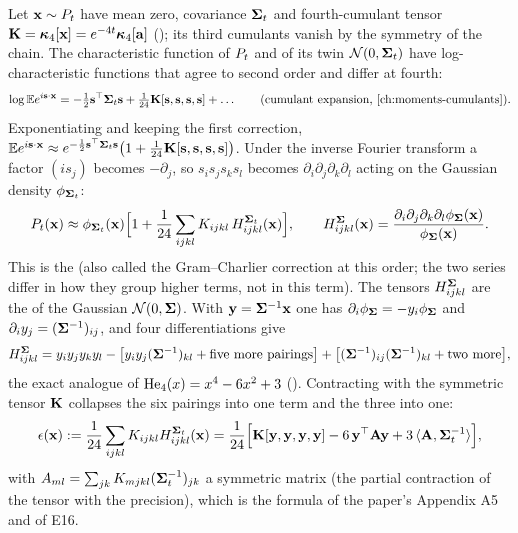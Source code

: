 Let $\mathbf{x}\sim P_t$ have mean zero, covariance $\mathbf{\Sigma}_t$ and fourth-cumulant tensor
$\mathbf{K}=\bm{\kappa}_4[\mathbf{x}]=e^{-4t}\bm{\kappa}_4[\mathbf{a}]$ (); its third
cumulants vanish by the symmetry of the chain. The characteristic function of $P_t$
and of its twin $\mathcal{N}\!\left(0,\mathbf{\Sigma}_t\right)$ have log-characteristic functions that agree to second
order and differ at fourth:
\begin{equation}
  \log\E e^{i\vect{s}\cdot\vx}=-\tfrac12\vect{s}^\top\Sig_t\vect{s}+\tfrac{1}{24}\mat{K}[\vect{s},\vect{s},\vect{s},\vect{s}]+\dots
  \qquad(\text{cumulant expansion, \Cref{ch:moments-cumulants}}).
\end{equation}
Exponentiating and keeping the first correction,
$\mathbb{E} e^{i\mathbf{s}\cdot\mathbf{x}}\approx e^{-\frac12\mathbf{s}^\top\mathbf{\Sigma}_t\mathbf{s}}\bigl(1+\tfrac1{24}\mathbf{K}[\mathbf{s},\mathbf{s},\mathbf{s},\mathbf{s}]\bigr)$.
Under the inverse Fourier transform a factor $(i s_j)$ becomes $-\partial_j$, so
$s_is_js_ks_l$ becomes $\partial_i\partial_j\partial_k\partial_l$ acting on the Gaussian density
$\phi_{\mathbf{\Sigma}_t}$:
\begin{equation}
  P_t(\mathbf{x})\approx\phi_{\mathbf{\Sigma}_t}(\mathbf{x})\Bigl[1+\frac1{24}\sum_{ijkl}K_{ijkl}\,H^{\mathbf{\Sigma}_t}_{ijkl}(\mathbf{x})\Bigr],
  \qquad
  H^{\mathbf{\Sigma}}_{ijkl}(\mathbf{x})=\frac{\partial_i\partial_j\partial_k\partial_l\phi_{\mathbf{\Sigma}}(\mathbf{x})}{\phi_{\mathbf{\Sigma}}(\mathbf{x})} .
  \label{eq:edgeworth}
\end{equation}
This is the  (also called the Gram--Charlier
correction at this order; the two series differ in how they group higher terms, not in
this term). The tensors $H^{\mathbf{\Sigma}}_{ijkl}$ are the 
of the Gaussian $\mathcal{N}\!\left(0,\mathbf{\Sigma}\right)$. With $\mathbf{y}=\mathbf{\Sigma}^{-1}\mathbf{x}$ one has
$\partial_i\phi_{\mathbf{\Sigma}}=-y_i\phi_{\mathbf{\Sigma}}$ and $\partial_iy_j=(\mathbf{\Sigma}^{-1})_{ij}$, and four
differentiations give
\begin{equation}
  H^{\mathbf{\Sigma}}_{ijkl}=y_iy_jy_ky_l-\bigl[y_iy_j(\mathbf{\Sigma}^{-1})_{kl}+\text{five more pairings}\bigr]
  +\bigl[(\mathbf{\Sigma}^{-1})_{ij}(\mathbf{\Sigma}^{-1})_{kl}+\text{two more}\bigr],
\end{equation}
the exact analogue of $\mathrm{He}_{4}(x)=x^4-6x^2+3$ (). Contracting
with the symmetric tensor $\mathbf{K}$ collapses the six pairings into one term and the
three into one:
\begin{equation}
  \epsilon(\mathbf{x}):=\frac1{24}\sum_{ijkl}K_{ijkl}H^{\mathbf{\Sigma}_t}_{ijkl}(\mathbf{x})
  =\frac1{24}\Bigl[\mathbf{K}[\mathbf{y},\mathbf{y},\mathbf{y},\mathbf{y}]-6\,\mathbf{y}^\top\mathbf{A}\mathbf{y}+3\,\langle\mathbf{A},\mathbf{\Sigma}_t^{-1}\rangle\Bigr],
  \label{eq:eps}
\end{equation}
with $A_{ml}=\sum_{jk}K_{mjkl}(\mathbf{\Sigma}_t^{-1})_{jk}$ a symmetric matrix (the partial
contraction of the tensor with the precision), which is the formula of the paper's
Appendix A5 and of E16.

